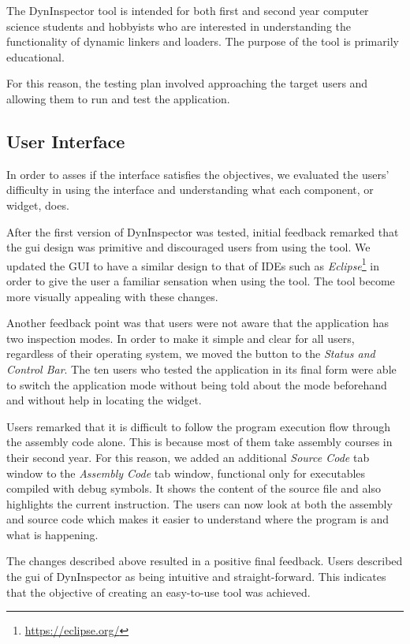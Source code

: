 The DynInspector tool is intended for both first and second year computer science students and hobbyists who are interested in understanding the functionality of dynamic linkers and loaders. The purpose of the tool is primarily educational.

For this reason, the testing plan involved approaching the target users and allowing them to run and test the application.

\subsection{User Interface}

In order to asses if the interface satisfies the objectives, we evaluated the users' difficulty in using the interface and understanding what each component, or widget, does.

After the first version of DynInspector was tested, initial feedback remarked that the gui design was primitive and discouraged users from using the tool. We updated the GUI to have a similar design to that of IDEs such as \textit{Eclipse}\footnote{\url{https://eclipse.org/}} in order to give the user a familiar sensation when using the tool. The tool become more visually appealing with these changes.

Another feedback point was that users were not aware that the application has two inspection modes. In order to make it simple and clear for all users, regardless of their operating system, we moved the button to the \textit{Status and Control Bar}. The ten users who tested the application in its final form were able to switch the application mode without being told about the mode beforehand and without help in locating the widget.

Users remarked that it is difficult to follow the program execution flow through the assembly code alone. This is because most of them take assembly courses in their second year. For this reason, we added an additional \textit{Source Code} tab window to the \textit{Assembly Code} tab window, functional only for executables compiled with debug symbols. It shows the content of the source file and also highlights the current instruction. The users can now look at both the assembly and source code which makes it easier to understand where the program is and what is happening.

The changes described above resulted in a positive final feedback. Users described the gui of DynInspector as being intuitive and straight-forward. This indicates that the objective of creating an easy-to-use tool was achieved.

